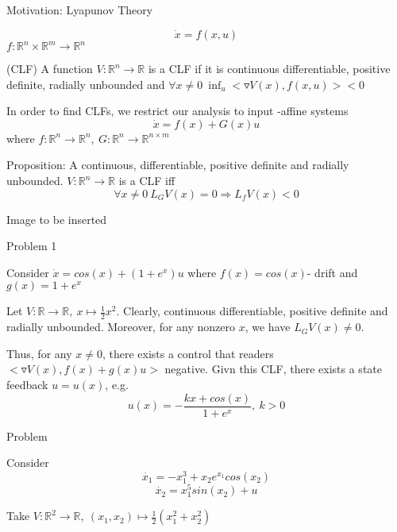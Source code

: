 Motivation: Lyapunov Theory

\begin{equation*}
\dot{x} = f(x,u)
\end{equation*}
$f:\mathbb{R}^n \times \mathbb{R}^m \to \mathbb{R}^n$

\begin{Definition}
(CLF) A function $V: \mathbb{R}^n \to \mathbb{R}$ is a CLF if it is continuous differentiable, positive definite, radially unbounded and $ \forall x \neq 0 \ \inf_{u}< \triangledown V(x), f(x,u) > < 0$ 
\end{Definition}

In order to find CLFs, we restrict our analysis to input -affine systems
\begin{equation*}
\dot{x} = f(x) + G(x)u
\end{equation*}
where $f: \mathbb{R}^n \to \mathbb{R}^n, \ G: \mathbb{R}^n \to \mathbb{R}^{n \times m}$

Proposition: A continuous, differentiable, positive definite and radially unbounded. $V: \mathbb{R}^n \to \mathbb{R}$ is a CLF iff 
\begin{equation*}
\forall x \neq 0 \ L_GV(x) = 0 \Rightarrow L_fV(x) < 0
\end{equation*}

Image to be inserted

Problem 1

Consider $\dot{x} = cos(x) + (1+e^x)u$ where $f(x) = cos(x)$- drift and $g(x) = 1+e^x$

Let $V: \mathbb{R} \to \mathbb{R}, \ x \mapsto \frac{1}{2}x^2$. Clearly, continuous differentiable, positive definite and radially unbounded. Moreover, for any nonzero $x$, we have $L_GV(x) \neq 0$. 

Thus, for any $x \neq 0$, there exists a control that readers $<\triangledown V(x), f(x) + g(x)u>$ negative. 
Givn this CLF, there exists a state feedback $u = u(x)$, e.g. 
\begin{equation*}
u(x) = - \frac{kx+cos(x)}{1+e^x}, \ k > 0
\end{equation*}

Problem

Consider 
\begin{equation*}
\dot{x_1} = -x_1^3 + x_2e^{x_1}cos(x_2)
\end{equation*}  
\begin{equation*}
\dot{x_2} = x_1^5sin(x_2) + u
\end{equation*}

Take $V: \mathbb{R}^2 \to \mathbb{R}, \ (x_1, x_2) \mapsto \frac{1}{2}(x_1^2 + x_2^2)$

